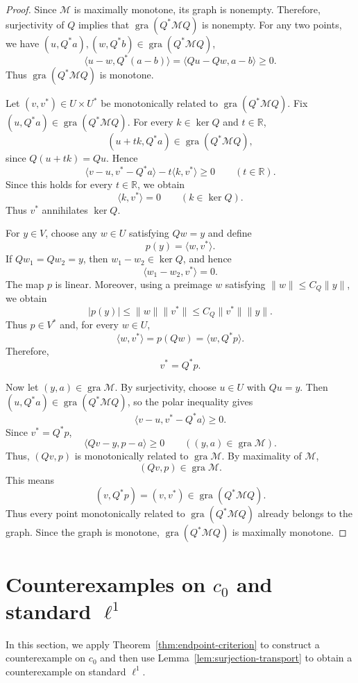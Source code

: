 \documentclass[11pt]{article}
\newcommand{\R}{\mathbb R}
\newcommand{\gra}{\operatorname{gra}}
\newcommand{\pair}[2]{\langle #1,#2\rangle}
\theoremstyle{definition}
\theoremstyle{remark}
\begin{document}
\begin{proof}
Since $\mathcal M$ is maximally monotone, its graph is nonempty. Therefore, surjectivity of $Q$ implies that $\gra(Q^*\mathcal M Q)$ is nonempty. For any two points, we have 
$(u,Q^*a),(w,Q^*b)\in\gra(Q^*\mathcal M Q)$,
\[
\pair{u-w}{Q^*(a-b)}
=
\pair{Qu-Qw}{a-b}
\ge0.
\]
Thus $\gra(Q^*\mathcal M Q)$ is monotone.

Let $(v,v^*)\in U\times U^*$ be monotonically related to
$\gra(Q^*\mathcal M Q)$. Fix
$(u,Q^*a)\in\gra(Q^*\mathcal M Q)$. For every
$k\in\ker Q$ and $t\in\R$,
\[
(u+tk,Q^*a)\in\gra(Q^*\mathcal M Q),
\]
since $Q(u+tk)=Qu$. Hence
\[
\pair{v-u}{v^*-Q^*a}
-t\pair{k}{v^*}\ge0
\qquad(t\in\R).
\]
Since this holds for every $t\in\R$, we obtain
\[
\pair{k}{v^*}=0
\qquad(k\in\ker Q).
\]
Thus $v^*$ annihilates $\ker Q$.

For $y\in V$, choose any $w\in U$ satisfying $Qw=y$ and define
\[
p(y)=\pair{w}{v^*}.
\]
If $Qw_1=Qw_2=y$, then
$w_1-w_2\in\ker Q$, and hence
\[
\pair{w_1-w_2}{v^*}=0.
\]
The map $p$ is linear. Moreover, using a preimage $w$ satisfying
$\|w\|\le C_Q\|y\|$, we obtain
\[
|p(y)|
\le
\|w\|\|v^*\|
\le
C_Q\|v^*\|\|y\|.
\]
Thus $p\in V^*$ and, for every $w\in U$,
\[
\pair{w}{v^*}
=
p(Qw)
=
\pair{w}{Q^*p}.
\]
Therefore,
\[
v^*=Q^*p.
\]

Now let $(y,a)\in\gra\mathcal M$. By surjectivity, choose
$u\in U$ with $Qu=y$. Then
$(u,Q^*a)\in\gra(Q^*\mathcal M Q)$, so the polar inequality gives
\[
\pair{v-u}{v^*-Q^*a}\ge0.
\]
Since $v^*=Q^*p$,
\[
\pair{Qv-y}{p-a}\ge0
\qquad((y,a)\in\gra\mathcal M).
\]
Thus, $(Qv,p)$ is monotonically related to $\gra\mathcal M$. By maximality of $\mathcal M$,
\[
(Qv,p)\in\gra\mathcal M.
\]
This means
\[
(v,Q^*p)=(v,v^*)\in\gra(Q^*\mathcal M Q).
\]
Thus every point monotonically related to
$\gra(Q^*\mathcal M Q)$ already belongs to the graph. Since the graph is monotone, $\gra(Q^*\mathcal M Q)$ is maximally monotone. 
\end{proof}

\section{Counterexamples on $c_0$ and standard $\ell^1$}
\label{sec:counterexamples}
In this section, we apply Theorem~\ref{thm:endpoint-criterion} to construct a counterexample on $c_0$ and then use Lemma~\ref{lem:surjection-transport} to obtain a counterexample on standard $\ell^1$.


\end{document}
